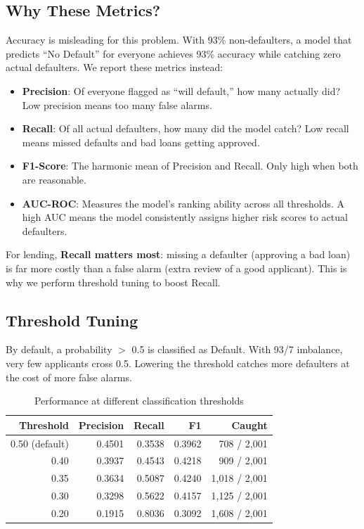 \documentclass[12pt, a4paper]{article}
\begin{document}
\subsection{Why These Metrics?}

Accuracy is misleading for this problem. With 93\% non-defaulters, a model that predicts ``No Default'' for everyone achieves 93\% accuracy while catching zero actual defaulters. We report these metrics instead:

\begin{itemize}[noitemsep]
    \item \textbf{Precision}: Of everyone flagged as ``will default,'' how many actually did? Low precision means too many false alarms.
    \item \textbf{Recall}: Of all actual defaulters, how many did the model catch? Low recall means missed defaults and bad loans getting approved.
    \item \textbf{F1-Score}: The harmonic mean of Precision and Recall. Only high when both are reasonable.
    \item \textbf{AUC-ROC}: Measures the model's ranking ability across all thresholds. A high AUC means the model consistently assigns higher risk scores to actual defaulters.
\end{itemize}

For lending, \textbf{Recall matters most}: missing a defaulter (approving a bad loan) is far more costly than a false alarm (extra review of a good applicant). This is why we perform threshold tuning to boost Recall.

\subsection{Threshold Tuning}

By default, a probability $>$ 0.5 is classified as Default. With 93/7 imbalance, very few applicants cross 0.5. Lowering the threshold catches more defaulters at the cost of more false alarms.

\begin{table}[H]
\centering
\begin{tabular}{rrrrr}
\toprule
\textbf{Threshold} & \textbf{Precision} & \textbf{Recall} & \textbf{F1} & \textbf{Caught} \\
\midrule
0.50 (default) & 0.4501 & 0.3538 & 0.3962 & 708 / 2,001 \\
0.40 & 0.3937 & 0.4543 & 0.4218 & 909 / 2,001 \\
0.35 & 0.3634 & 0.5087 & 0.4240 & 1,018 / 2,001 \\
0.30 & 0.3298 & 0.5622 & 0.4157 & 1,125 / 2,001 \\
0.20 & 0.1915 & 0.8036 & 0.3092 & 1,608 / 2,001 \\
\bottomrule
\end{tabular}
\caption{Performance at different classification thresholds}
\end{table}
\end{document}
